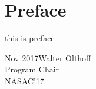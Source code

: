 \chapter*{Preface}
%

this is preface

\vspace{1cm}

\begin{flushright}\noindent
Nov 2017\hfill Walter Olthoff\\
Program Chair\\
NASAC'17
\end{flushright}
